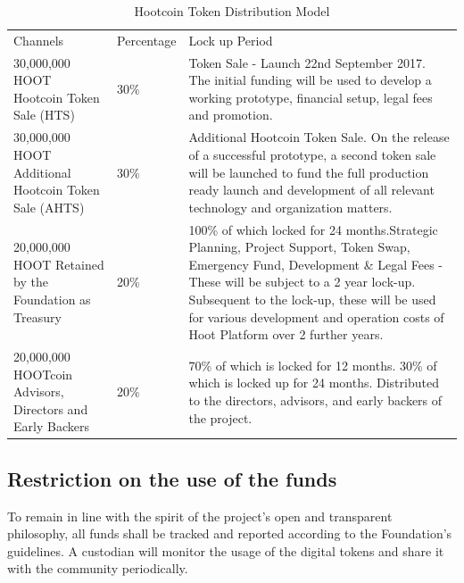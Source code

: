 \documentclass{article}
\begin{document}
\begin{table}[!htb]
\centering
\begin{tabular}{ |p{2.8cm}|p{2.5cm}|p{5cm}|}
\hline
\rowcolor{lightgray} \multicolumn{3}{|c|}{Hootcoin Token Distribution Model} \\
\hline
Channels & Percentage & Lock up Period \\
\hline
30,000,000 HOOT Hootcoin Token Sale (HTS) & 30\% & Token Sale - Launch 22nd September 2017. The initial funding will be used to develop a working prototype, financial setup, legal fees and promotion.
 \\
 \hline
30,000,000 HOOT Additional Hootcoin Token Sale (AHTS) & 30\% & Additional Hootcoin Token Sale. On the release of a successful prototype, a second token sale will be launched to fund the full production ready launch and development of all relevant technology and organization matters.
\\
\hline
20,000,000 HOOT Retained by the Foundation as Treasury & 20\% & 100\% of which locked for 24 months.Strategic Planning, Project Support, Token Swap, Emergency Fund, Development \& Legal Fees - These will be subject to a 2 year lock-up. Subsequent to the lock-up, these will be used for various development and operation costs of Hoot Platform over 2 further years.
\\
\hline
20,000,000 HOOTcoin Advisors, Directors and Early Backers & 20\% & 70\% of which is locked for 12 months. 30\% of which is locked up for 24 months. Distributed to the directors, advisors, and early backers of the
 project.
\\
 \hline
\end{tabular}
\caption{Hootcoin Token Distribution Model}
\label{table:hoot_token_distribution_model}
\end{table}


\subsection{Restriction on the use of the funds} %
\label{sub:restriction_on_the_use_of_the_funds}
To remain in line with the spirit of the project’s open and transparent philosophy, all funds shall be tracked and reported according to the Foundation’s guidelines. A custodian will monitor the usage of the digital tokens and share it with the community periodically.
\end{document}
